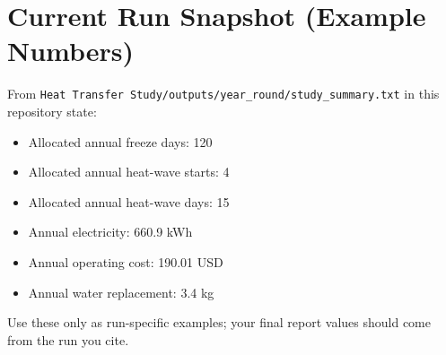 \documentclass[11pt]{article}
\begin{document}
\section{Current Run Snapshot (Example Numbers)}
From \texttt{Heat Transfer Study/outputs/year\_round/study\_summary.txt} in this repository state:
\begin{itemize}[leftmargin=*]
\item Allocated annual freeze days: 120
\item Allocated annual heat-wave starts: 4
\item Allocated annual heat-wave days: 15
\item Annual electricity: 660.9 kWh
\item Annual operating cost: 190.01 USD
\item Annual water replacement: 3.4 kg
\end{itemize}
Use these only as run-specific examples; your final report values should come from the run you cite.
\end{document}
